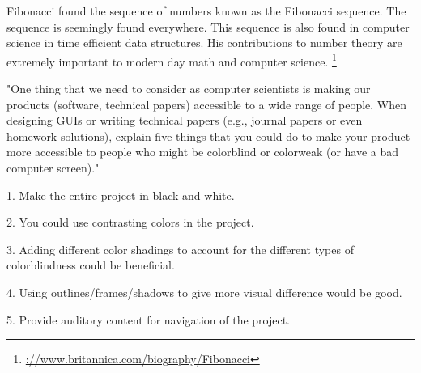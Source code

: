 \documentclass{article}
\begin{document}
\clearpage
\header

Fibonacci found the sequence of numbers known as the Fibonacci sequence. The sequence is seemingly found everywhere. This sequence is also found in computer science in time efficient data structures. His contributions to number theory are extremely important to modern day math and computer science.
\footnote{\hyperref[Resource 1]{\ulhttps://www.britannica.com/biography/Fibonacci}}



\clearpage
\header

"One thing that we need to consider as computer scientists is making our products (software, technical papers) accessible to a wide range of people. When designing GUIs or writing technical papers (e.g., journal papers or even homework solutions), explain five things that you could do to make your product more accessible to people who might be colorblind or colorweak (or have a bad computer screen)."

1. Make the entire project in black and white.
\item 2. You could use contrasting colors in the project.
\item 3. Adding different color shadings to account for the different types of colorblindness could be beneficial.
\item 4. Using outlines/frames/shadows to give more visual difference would be good.
\item 5. Provide auditory content for navigation of the project.
\end{document}
